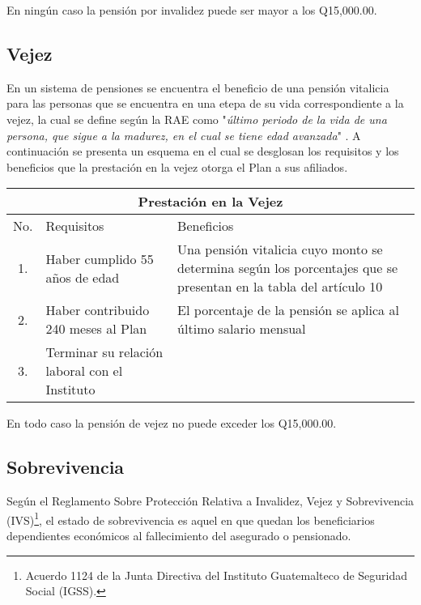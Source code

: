 \documentclass[12pt,letterpaper,titlepage]{article}
\begin{document}
{En ningún caso la pensión por invalidez puede ser mayor a los Q15,000.00.

\subsection{Vejez}

En un sistema de pensiones se encuentra el beneficio de una pensión vitalicia para las personas que se encuentra en una etepa de su vida correspondiente a la vejez, la cual se define según la RAE como "\textit{último periodo de la vida de una persona, que sigue a la madurez, en el cual se tiene edad avanzada}" . A continuación se presenta un esquema en el cual se desglosan los requisitos y los beneficios que la prestación en la vejez otorga el Plan a sus afiliados.


\begin{center}
	\begin{tabular}{|c||p{5cm}||p{6cm}|}
		\hline 
		\multicolumn{3}{|c|}{Prestación en la Vejez} \\ 
		\hline 
		\hline
		\rule[-1ex]{0pt}{2.5ex} No. & Requisitos &  Beneficios \\ 
		\hline 
		\rule[-1ex]{0pt}{2.5ex} 1. & Haber cumplido 55 años de edad & Una pensión vitalicia cuyo monto se determina según los porcentajes que se presentan en la tabla del artículo 10 \\ 
		\hline 
		\rule[-1ex]{0pt}{2.5ex} 2. & Haber contribuido 240 meses al Plan & El porcentaje de la pensión se aplica al último salario mensual \\ 
		\hline 
		\rule[-1ex]{0pt}{2.5ex} 3. & Terminar su relación laboral con el Instituto &  \\ 
		\hline 
	\end{tabular} 
\end{center} 

En todo caso la pensión de vejez no puede exceder los Q15,000.00.


\subsection{Sobrevivencia}

Según el Reglamento Sobre Protección Relativa a Invalidez, Vejez y Sobrevivencia (IVS)\footnote{Acuerdo 1124 de la Junta Directiva del Instituto Guatemalteco de Seguridad Social (IGSS).}, el estado de sobrevivencia es aquel en que quedan los beneficiarios dependientes económicos al fallecimiento del asegurado o pensionado.


}
\end{document}
